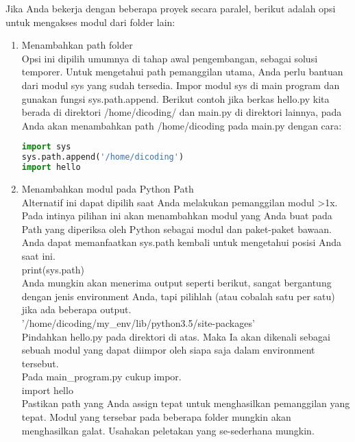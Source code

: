 Jika Anda bekerja dengan beberapa proyek secara paralel, berikut adalah opsi untuk mengakses modul dari folder lain:\\
\begin{enumerate}
\item Menambahkan path folder\\
Opsi ini dipilih umumnya di tahap awal pengembangan, sebagai solusi temporer. Untuk mengetahui path pemanggilan utama, Anda perlu bantuan dari modul sys yang sudah tersedia. Impor modul sys di main program dan gunakan fungsi sys.path.append. Berikut contoh jika berkas hello.py kita berada di direktori /home/dicoding/ dan main.py di direktori lainnya, pada Anda akan menambahkan path /home/dicoding pada main.py dengan cara:
\begin{lstlisting}[language=Python]
import sys
sys.path.append('/home/dicoding')
import hello
\end{lstlisting}
\item Menambahkan modul pada Python Path\\
Alternatif ini dapat dipilih saat Anda melakukan pemanggilan modul >1x. Pada intinya pilihan ini akan menambahkan modul yang Anda buat pada Path yang diperiksa oleh Python sebagai modul dan paket-paket bawaan. Anda dapat memanfaatkan sys.path kembali untuk mengetahui posisi Anda saat ini.\\

print(sys.path)\\
Anda mungkin akan menerima output seperti berikut, sangat bergantung dengan jenis environment Anda, tapi pilihlah (atau cobalah satu per satu) jika ada beberapa output.\\

'/home/dicoding/my\_env/lib/python3.5/site-packages'\\
Pindahkan hello.py pada direktori di atas. Maka Ia akan dikenali sebagai sebuah modul yang dapat diimpor oleh siapa saja dalam environment tersebut.\\

Pada main\_program.py cukup impor.\\

import hello\\


Pastikan path yang Anda assign tepat untuk menghasilkan pemanggilan yang tepat. Modul yang tersebar pada beberapa folder mungkin akan menghasilkan galat. Usahakan peletakan yang se-sederhana mungkin.\\
\end{enumerate}

